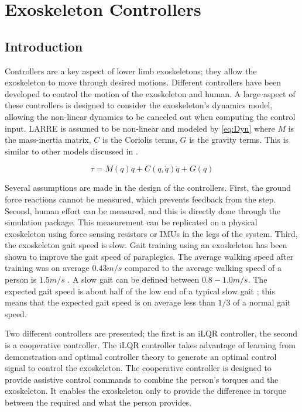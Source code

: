 \chapter{Exoskeleton Controllers}

\section{Introduction}

Controllers are a key aspect of lower limb exoskeletons; they allow the exoskeleton to move through desired motions. Different controllers have been developed to control the motion of the exoskeleton and human. A large aspect of these controllers is designed to consider the exoskeleton's dynamics model, allowing the non-linear dynamics to be canceled out when computing the control input. LARRE is assumed to be non-linear and modeled by \autoref{eq:Dyn} where $M$ is the mass-inertia matrix, $C$ is the Coriolis terms, $G$ is the gravity terms. This is similar to other models discussed in \cite{huo2016active} \cite{vantilt2019model}.

\begin{equation}
    \tau = M(q) \ddot{q} + C(q, \dot{q}) \dot{q} + G(q)
    \label{eq:Dyn}
\end{equation}


Several assumptions are made in the design of the controllers. First, the ground force reactions cannot be measured, which prevents feedback from the step. Second, human effort can be measured, and this is directly done through the simulation package. This measurement can be replicated on a physical exoskeleton using force sensing resistors or IMUs in the legs of the system. Third, the exoskeleton gait speed is slow. Gait training using an exoskeleton has been shown to improve the gait speed of paraplegics. The average walking speed after training was on average $0.43m/s$ \cite{khan2019retraining} compared to the average walking speed of a person is $1.5m/s$ \cite{fitzpatrick2006another}. A slow gait can be defined between $0.8-1.0m/s$. The expected gait speed is about half of the low end of a typical slow gait \cite{walsh2007quasi}; this means that the expected gait speed is on average less than $1/3$ of a normal gait speed. 

Two different controllers are presented; the first is an iLQR controller, the second is a cooperative controller. The iLQR controller takes advantage of learning from demonstration and optimal controller theory to generate an optimal control signal to control the exoskeleton. The cooperative controller is designed to provide assistive control commands to combine the person's torques and the exoskeleton. It enables the exoskeleton only to provide the difference in torque between the required and what the person provides. 


